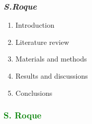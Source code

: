 



\maketitle

\begin{frame}
    \frametitle{\emph{S.Roque}}
\begin{enumerate}
\setcounter{enumi}{0}
\itemsep0.75em
\item Introduction
\item Literature review
\item Materials and methods
\item Results and discussions
\item Conclusions
\end{enumerate}    

\end{frame}



\begin{frame}
\frametitle{\textcolor{green}{S. Roque}}
\begin{center}
\end{center}
\begin{center}
\end{center}
\end{frame}














